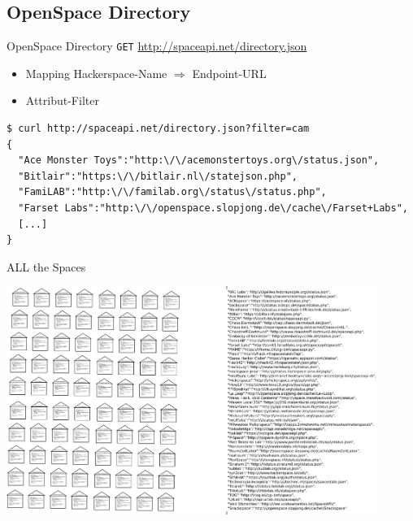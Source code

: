 \documentclass{beamer}
\begin{document}
\subsection{OpenSpace Directory}
\begin{frame}[fragile]{OpenSpace Directory}
\texttt{GET} \url{http://spaceapi.net/directory.json}
\begin{itemize}
	\item Mapping Hackerspace-Name $\Rightarrow$ Endpoint-URL
	\item Attribut-Filter
\end{itemize}

\begin{lstlisting}
$ curl http://spaceapi.net/directory.json?filter=cam
{
  "Ace Monster Toys":"http:\/\/acemonstertoys.org\/status.json",
  "Bitlair":"https:\/\/bitlair.nl\/statejson.php",
  "FamiLAB":"http:\/\/familab.org\/status\/status.php",
  "Farset Labs":"http:\/\/openspace.slopjong.de\/cache\/Farset+Labs",
  [...]
}
\end{lstlisting}
\end{frame}

\begin{frame}{ALL the Spaces}
	\begin{center}
		\includegraphics[width=0.9\textwidth]{allthespaces.png}
	\end{center}
\end{frame}
\end{document}
